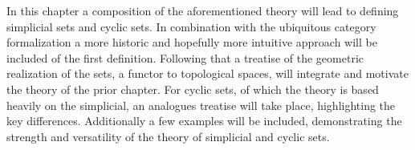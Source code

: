 \documentclass[../../main.tex]{subfiles}
\begin{document}
    In this chapter a composition of the aforementioned theory will lead to defining simplicial sets and cyclic sets. In combination with the ubiquitous category formalization a more historic and hopefully more intuitive approach will be included of the first definition. Following that a treatise of the geometric realization of the sets, a functor to topological spaces, will integrate and motivate the theory of the prior chapter. For cyclic sets, of which the theory is based heavily on the simplicial, an analogues treatise will take place, highlighting the key differences. Additionally a few examples will be included, demonstrating the strength and versatility of the theory of simplicial and cyclic sets.
\end{document}
